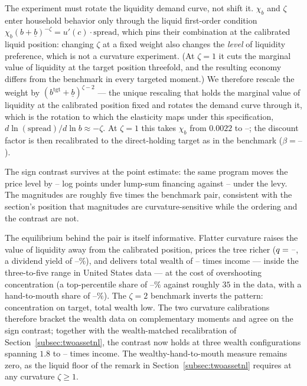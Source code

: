 \documentclass[12pt]{article}
\providecommand{\pendingnum}{\textit{--}}
\providecommand{\ZtenChi}{\pendingnum}\providecommand{\ZtenBeta}{\pendingnum}
\providecommand{\ZtenLS}{\pendingnum}\providecommand{\ZtenLevy}{\pendingnum}
\providecommand{\ZtenW}{\pendingnum}\providecommand{\ZtenTopOne}{\pendingnum}
\providecommand{\ZtenYield}{\pendingnum}\providecommand{\ZtenHtM}{\pendingnum}
\begin{document}
The experiment must rotate the liquidity demand curve, not shift it.
$\chi_b$ and $\zeta$ enter household behavior only through the liquid
first-order condition $\chi_b (b + \underline{b})^{-\zeta} = u'(c) \cdot
\text{spread}$, which pins their combination at the calibrated liquid
position: changing $\zeta$ at a fixed weight also changes the \emph{level}
of liquidity preference, which is not a curvature experiment. (At
$\zeta = 1$ it cuts the marginal value of liquidity at the target position
threefold, and the resulting economy differs from the benchmark in every
targeted moment.) We therefore rescale the weight by
$(b^{\mathrm{tgt}} + \underline{b})^{\zeta - 2}$ --- the unique rescaling
that holds the marginal value of liquidity at the calibrated position
fixed and rotates the demand curve through it, which is the rotation to which
the \citeauthor{krishnamurthy2012} elasticity maps under this specification,
$d\ln(\text{spread})/d\ln b \approx -\zeta$. At $\zeta = 1$
this takes $\chi_b$ from $0.0022$ to $\ZtenChi$; the discount factor is
then recalibrated to the direct-holding target as in the benchmark
($\beta = \ZtenBeta$).

The sign contrast survives at the point estimate: the same program moves
the price level by $\ZtenLS$ log points under lump-sum financing against
$\ZtenLevy$ under the levy. The magnitudes are roughly five times the
benchmark pair, consistent with the section's position that magnitudes
are curvature-sensitive while the ordering and the contrast are not.

The equilibrium behind the pair is itself informative. Flatter curvature
raises the value of liquidity away from the calibrated position, prices
the tree richer ($q = \ZtenQ$, a dividend yield of $\ZtenYield\%$), and
delivers total wealth of $\ZtenW$ times income --- inside the three-to-five
range in United States data --- at the cost of overshooting concentration
(a top-percentile share of $\ZtenTopOne\%$ against roughly $35$ in the
data, with a hand-to-mouth share of $\ZtenHtM\%$). The $\zeta = 2$
benchmark inverts the pattern: concentration on target, total wealth low.
The two curvature calibrations therefore bracket the wealth data on
complementary moments and agree on the sign contrast; together with the
wealth-matched recalibration of Section~\ref{subsec:twoassetnl}, the
contrast now holds at three wealth configurations spanning $1.8$ to
$\ZtenW$ times income. The wealthy-hand-to-mouth measure remains zero, as
the liquid floor of the remark in Section~\ref{subsec:twoassetnl} requires
at any curvature $\zeta \ge 1$.
\end{document}
